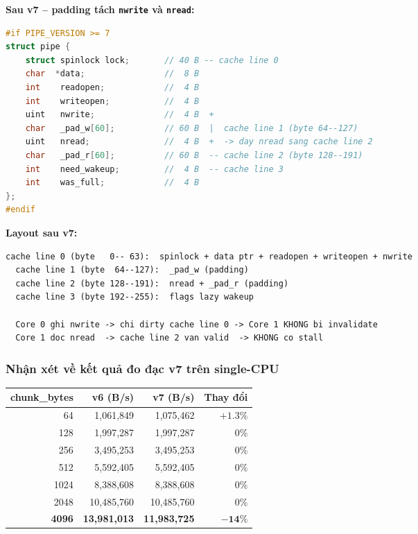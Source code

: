 \documentclass[11pt,a4paper]{article}
\begin{document}
\textbf{Sau v7 -- padding tách \texttt{nwrite} và \texttt{nread}:}

\begin{lstlisting}[language=C]
#if PIPE_VERSION >= 7
struct pipe {
    struct spinlock lock;       // 40 B -- cache line 0
    char  *data;                //  8 B
    int    readopen;            //  4 B
    int    writeopen;           //  4 B
    uint   nwrite;              //  4 B  +
    char   _pad_w[60];          // 60 B  |  cache line 1 (byte 64--127)
    uint   nread;               //  4 B  +  -> day nread sang cache line 2
    char   _pad_r[60];          // 60 B  -- cache line 2 (byte 128--191)
    int    need_wakeup;         //  4 B  -- cache line 3
    int    was_full;            //  4 B
};
#endif
\end{lstlisting}

\textbf{Layout sau v7:}

\begin{lstlisting}[style=plain]
  cache line 0 (byte   0-- 63):  spinlock + data ptr + readopen + writeopen + nwrite
  cache line 1 (byte  64--127):  _pad_w (padding)
  cache line 2 (byte 128--191):  nread + _pad_r (padding)
  cache line 3 (byte 192--255):  flags lazy wakeup

  Core 0 ghi nwrite -> chi dirty cache line 0 -> Core 1 KHONG bi invalidate
  Core 1 doc nread  -> cache line 2 van valid  -> KHONG co stall
\end{lstlisting}

\subsubsection{Nhận xét về kết quả đo đạc v7 trên single-CPU}

\begin{center}
\begin{tabular}{rrrr}
\toprule
\textbf{chunk\_bytes} & \textbf{v6 (B/s)} & \textbf{v7 (B/s)} & \textbf{Thay đổi} \\
\midrule
64   & 1{,}061{,}849  & 1{,}075{,}462  & $+1.3\%$ \\
128  & 1{,}997{,}287  & 1{,}997{,}287  & $0\%$ \\
256  & 3{,}495{,}253  & 3{,}495{,}253  & $0\%$ \\
512  & 5{,}592{,}405  & 5{,}592{,}405  & $0\%$ \\
1024 & 8{,}388{,}608  & 8{,}388{,}608  & $0\%$ \\
2048 & 10{,}485{,}760 & 10{,}485{,}760 & $0\%$ \\
\textbf{4096} & \textbf{13{,}981{,}013} & \textbf{11{,}983{,}725} & $\mathbf{-14\%}$ \\
\bottomrule
\end{tabular}
\end{center}
\end{document}
